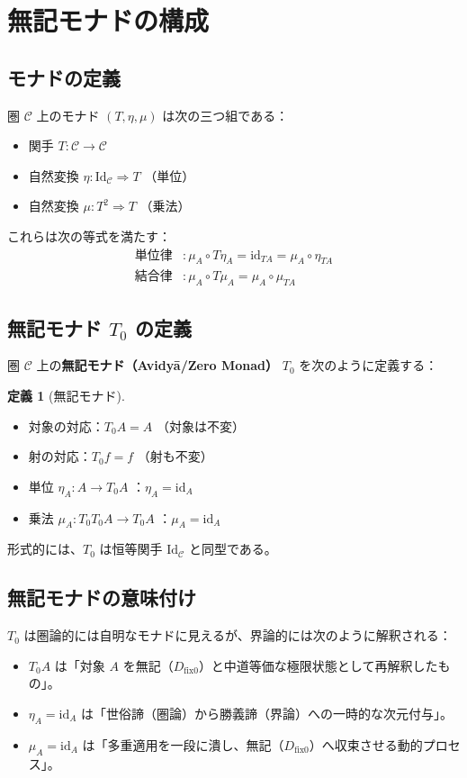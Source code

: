 \documentclass[11pt,a4paper]{article}
\theoremstyle{definition}
\newtheorem{definition}{定義}[section]
\newcommand{\dfix}{D_{\mathrm{fix}0}} %
\begin{document}
\section{無記モナドの構成}

\subsection{モナドの定義}
圏 $\mathcal{C}$ 上のモナド $(T, \eta, \mu)$ は次の三つ組である：
\begin{itemize}
    \item 関手 $T : \mathcal{C} \to \mathcal{C}$
    \item 自然変換 $\eta : \mathrm{Id}_{\mathcal{C}} \Rightarrow T$ （単位）
    \item 自然変換 $\mu : T^2 \Rightarrow T$ （乗法）
\end{itemize}
これらは次の等式を満たす：
\begin{align}
    \text{単位律} &: \mu_A \circ T\eta_A = \mathrm{id}_{TA} = \mu_A \circ \eta_{TA} \\
    \text{結合律} &: \mu_A \circ T\mu_A = \mu_A \circ \mu_{TA}
\end{align}

\subsection{無記モナド $T_0$ の定義}
圏 $\mathcal{C}$ 上の\textbf{無記モナド（Avidy\=a/Zero Monad）} $T_0$ を次のように定義する：
\begin{definition}[無記モナド]
\begin{itemize}
    \item 対象の対応：$T_0 A = A$ （対象は不変）
    \item 射の対応：$T_0 f = f$ （射も不変）
    \item 単位 $\eta_A : A \to T_0 A$ ：$\eta_A = \mathrm{id}_A$
    \item 乗法 $\mu_A : T_0 T_0 A \to T_0 A$ ：$\mu_A = \mathrm{id}_A$
\end{itemize}
\end{definition}
形式的には、$T_0$ は恒等関手 $\mathrm{Id}_{\mathcal{C}}$ と同型である。

\subsection{無記モナドの意味付け}
$T_0$ は圏論的には自明なモナドに見えるが、界論的には次のように解釈される：
\begin{itemize}
    \item $T_0 A$ は「対象 $A$ を無記（$\dfix$）と中道等価な極限状態として再解釈したもの」。
    \item $\eta_A = \mathrm{id}_A$ は「世俗諦（圏論）から勝義諦（界論）への一時的な次元付与」。
    \item $\mu_A = \mathrm{id}_A$ は「多重適用を一段に潰し、無記（$\dfix$）へ収束させる動的プロセス」。
\end{itemize}
\end{document}
